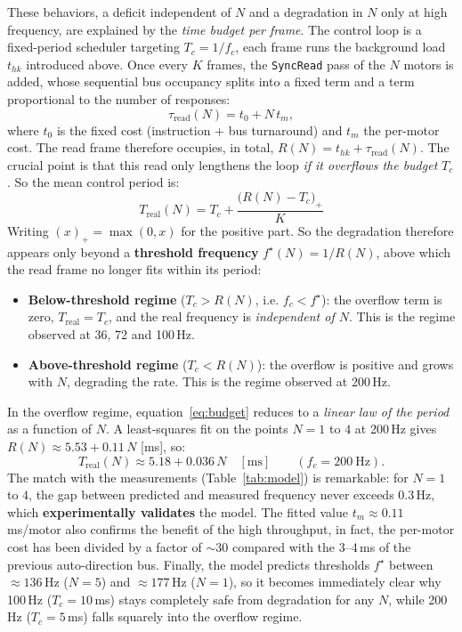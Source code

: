 \documentclass{tropLaClasse}
\begin{document}
These behaviors, a deficit independent of $N$ and a degradation in $N$ only at high frequency, are explained by the \emph{time budget per frame}. The control loop is a fixed-period scheduler targeting $T_c = 1/f_c$, each frame runs the background load $t_{hk}$ introduced above. Once every $K$ frames, the \texttt{SyncRead} pass of the $N$ motors is added, whose sequential bus occupancy splits into a fixed term and a term proportional to the number of responses:
\begin{equation}
\tau_{\text{read}}(N) = t_0 + N\, t_m ,
\label{eq:tauread}
\end{equation}
where $t_0$ is the fixed cost (instruction + bus turnaround) and $t_m$ the per-motor cost. The read frame therefore occupies, in total, $R(N) = t_{hk} + \tau_{\text{read}}(N)$. The crucial point is that this read only lengthens the loop \emph{if it overflows the budget} $T_c$. So the mean control period is:
\begin{equation}
\boxed{\;T_{\text{real}}(N) = T_c + \frac{\bigl(R(N) - T_c\bigr)_+}{K}\;}
\label{eq:budget}
\end{equation}
Writing $(x)_+ = \max(0, x)$ for the positive part. So the degradation therefore appears only beyond a \textbf{threshold frequency} $f^\star(N) = 1/R(N)$, above which the read frame no longer fits within its period:
\begin{itemize}
    \item \textbf{Below-threshold regime} ($T_c > R(N)$, i.e. $f_c < f^\star$): the overflow term is zero, $T_{\text{real}} = T_c$, and the real frequency is \emph{independent of $N$}. This is the regime observed at 36, 72 and 100\,Hz.
    \item \textbf{Above-threshold regime} ($T_c < R(N)$): the overflow is positive and grows with $N$, degrading the rate. This is the regime observed at 200\,Hz.
\end{itemize}

In the overflow regime, equation~\eqref{eq:budget} reduces to a \emph{linear law of the period} as a function of $N$. A least-squares fit on the points $N = 1$ to $4$ at 200\,Hz gives $R(N) \approx 5.53 + 0.11\,N$ [ms], so:
\begin{equation}
T_{\text{real}}(N) \approx 5.18 + 0.036\,N \quad [\text{ms}] \qquad (f_c = 200~\text{Hz}).
\label{eq:fit}
\end{equation}
The match with the measurements (Table~\ref{tab:model}) is remarkable: for $N = 1$ to $4$, the gap between predicted and measured frequency never exceeds $0.3$\,Hz, which \textbf{experimentally validates} the model. The fitted value $t_m \approx 0.11$\,ms/motor also confirms the benefit of the high throughput, in fact, the per-motor cost has been divided by a factor of $\sim 30$ compared with the 3--4\,ms of the previous auto-direction bus. Finally, the model predicts thresholds $f^\star$ between $\approx 136$\,Hz ($N = 5$) and $\approx 177$\,Hz ($N = 1$), so it becomes immediately clear why 100\,Hz ($T_c = 10$\,ms) stays completely safe from degradation for any $N$, while 200\,Hz ($T_c = 5$\,ms) falls squarely into the overflow regime.
\end{document}
